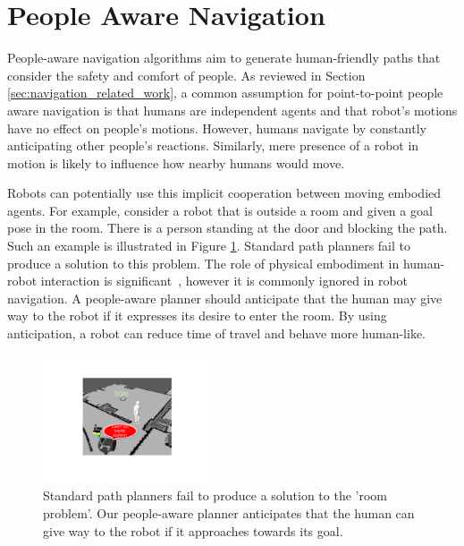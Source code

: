 \section{People Aware Navigation}
\label{sec:navigation_people_aware_navigation}

People-aware navigation algorithms aim to generate human-friendly paths that consider the safety and comfort of people. As reviewed in Section \ref{sec:navigation_related_work}, a common assumption for point-to-point people aware navigation is that humans are independent agents and that robot's motions have no effect on people's motions. However, humans navigate by constantly anticipating other people's reactions. Similarly, mere presence of a robot in motion is likely to influence how nearby humans would move. 

Robots can potentially use this implicit cooperation between moving embodied agents. For example, consider a robot that is outside a room and given a goal pose in the room. There is a person standing at the door and blocking the path. Such an example is illustrated in Figure \ref{fig:room}. Standard path planners fail to produce a solution to this problem. The role of physical embodiment in human-robot interaction is significant~\cite{wainer2006role}, however it is commonly ignored in robot navigation. A people-aware planner should anticipate that the human may give way to the robot if it expresses its desire to enter the room. By using anticipation, a robot can reduce time of travel and behave more human-like.

\begin{figure}[t!]
\centering
\includegraphics[width=0.45\textwidth]{pics/room_crop}
\caption{Standard path planners fail to produce a solution to the 'room problem'. Our people-aware planner anticipates that the human can give way to the robot if it approaches towards its goal.}
\label{fig:room}
\end{figure}

